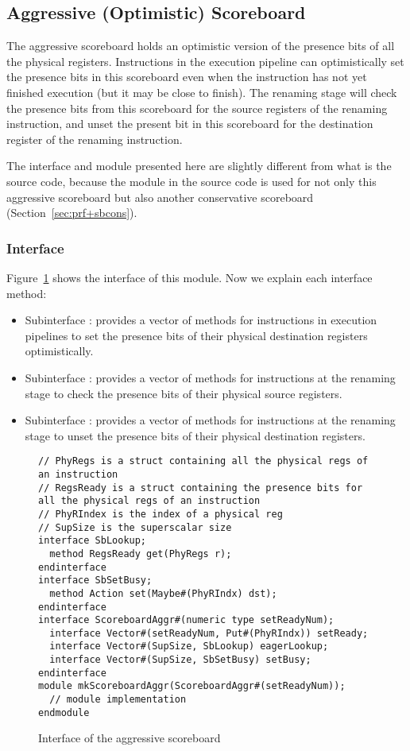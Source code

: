 \subsection{Aggressive (Optimistic) Scoreboard}\label{sec:sbaggr}

The aggressive scoreboard holds an optimistic version of the presence bits of all the physical registers.
Instructions in the execution pipeline can optimistically set the presence bits in this scoreboard even when the instruction has not yet finished execution (but it may be close to finish).
The renaming stage will check the presence bits from this scoreboard for the source registers of the renaming instruction, and unset the present bit in this scoreboard for the destination register of the renaming instruction.

The interface and module presented here are slightly different from what is the source code, because the module in the source code is used for not only this aggressive scoreboard but also another conservative scoreboard (Section~\ref{sec:prf+sbcons}).

\subsubsection{Interface}
Figure~\ref{fig:aggr-sb-ifc} shows the interface of this module.
Now we explain each interface method: 
\begin{itemize}
    \item Subinterface : provides a vector of methods for instructions in execution pipelines to set the presence bits of their physical destination registers optimistically.
    \item Subinterface : provides a vector of methods for instructions at the renaming stage to check the presence bits of their physical source registers.
    \item Subinterface : provides a vector of methods for instructions at the renaming stage to unset the presence bits of their physical destination registers.
\end{itemize}

\begin{figure}
\begin{lstlisting}[caption={}]
// PhyRegs is a struct containing all the physical regs of an instruction
// RegsReady is a struct containing the presence bits for all the physical regs of an instruction
// PhyRIndex is the index of a physical reg
// SupSize is the superscalar size
interface SbLookup;
  method RegsReady get(PhyRegs r);
endinterface
interface SbSetBusy;
  method Action set(Maybe#(PhyRIndx) dst);
endinterface
interface ScoreboardAggr#(numeric type setReadyNum);
  interface Vector#(setReadyNum, Put#(PhyRIndx)) setReady;
  interface Vector#(SupSize, SbLookup) eagerLookup;
  interface Vector#(SupSize, SbSetBusy) setBusy;
endinterface
module mkScoreboardAggr(ScoreboardAggr#(setReadyNum));
  // module implementation
endmodule
\end{lstlisting}
\caption{Interface of the aggressive scoreboard}\label{fig:aggr-sb-ifc}
\end{figure}


